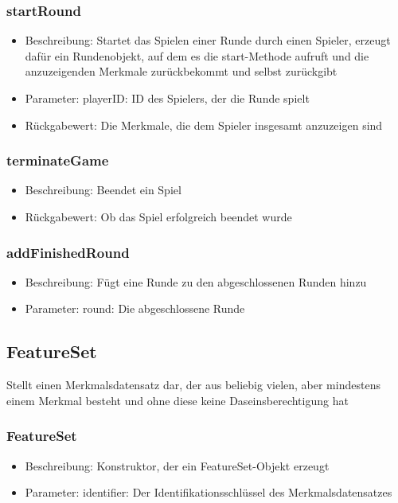 \documentclass[a4paper]{scrreprt}
\begin{document}
	\subsubsection{startRound}
		\begin{itemize}
			\item Beschreibung: Startet das Spielen einer Runde durch einen Spieler, erzeugt dafür ein Rundenobjekt, auf dem es die start-Methode aufruft und die anzuzeigenden Merkmale zurückbekommt und selbst zurückgibt
			\item Parameter: playerID: ID des Spielers, der die Runde spielt
			\item Rückgabewert: Die Merkmale, die dem Spieler insgesamt anzuzeigen sind
		\end{itemize}
	\subsubsection{terminateGame}
		\begin{itemize}
			\item Beschreibung: Beendet ein Spiel
			\item Rückgabewert: Ob das Spiel erfolgreich beendet wurde
		\end{itemize}
	\subsubsection{addFinishedRound}
	\begin{itemize}
	\item Beschreibung: Fügt eine Runde zu den abgeschlossenen Runden hinzu
	\item Parameter: round: Die abgeschlossene Runde
	\end{itemize}

	\subsection{FeatureSet}
	Stellt einen Merkmalsdatensatz dar, der aus beliebig vielen, aber mindestens einem Merkmal besteht und ohne diese keine Daseinsberechtigung hat
	\subsubsection{FeatureSet}
		\begin{itemize}
		\item Beschreibung: Konstruktor, der ein FeatureSet-Objekt erzeugt
		\item Parameter: identifier: Der Identifikationsschlüssel des Merkmalsdatensatzes
		\end{itemize}
\end{document}

